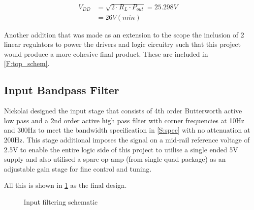 \documentclass[11pt]{article}
\begin{document}
{\vspace*{-10mm}
\begin{align*}
  V_{DD} &= \sqrt{2\cdot R_{L}\cdot P_{out}} = 25.298V\\
         &= 26V (min)
\end{align*}

Another addition that was made as an extension to the scope the inclusion of 2 linear regulators to power the drivers and logic circuitry such that this project would produce a more cohesive final product. These are included in \cref{F:top_schem}.


\subsection{Input Bandpass Filter}

Nickolai designed the input stage that consists of 4th order Butterworth active low pass and a 2nd order active high pass filter with corner frequencies at 10Hz and 300Hz to meet the bandwidth specification in \cref{S:spec} with no attenuation at 200Hz. This stage additional imposes the signal on a mid-rail reference voltage of 2.5V to enable the entire logic side of this project to utilise a single ended 5V supply and also utilised a spare op-amp (from single quad package) as an adjustable gain stage for fine control and tuning.

All this is shown in \cref{F:ipf_schem} as the final design.

\begin{figure}[h!]
  \centering
  \caption{Input filtering schematic}
  \label{F:ipf_schem}
\end{figure}

}
\end{document}
